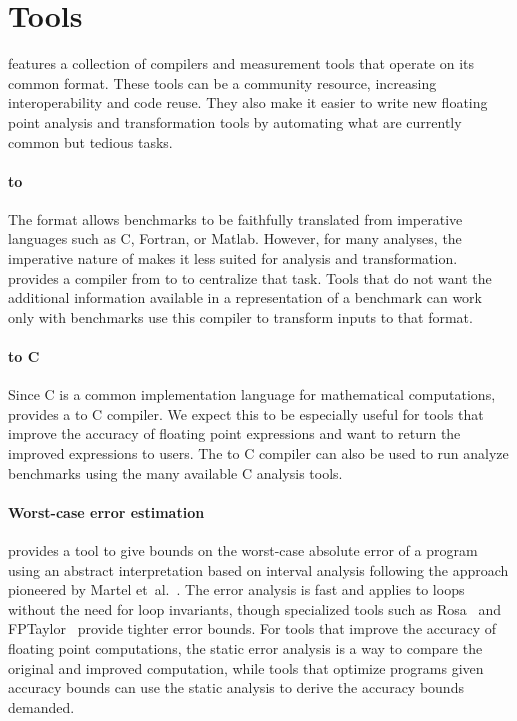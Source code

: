 \documentclass[main.tex]{subfiles}
\begin{document}
\section{Tools}
\label{sec:tools}

\name features
  a collection of compilers and measurement tools
  that operate on its common format.
These tools can be a community resource,
  increasing interoperability and code reuse.
They also make it easier to write
  new floating point analysis and transformation tools
  by automating what are currently
  common but tedious tasks.

\paragraph{\surface to \core}
The \surface format allows \name benchmarks
  to be faithfully translated from imperative languages
  such as C, Fortran, or Matlab.
However, for many analyses,
  the imperative nature of \surface
  makes it less suited for analysis and transformation.
\name provides a compiler from \surface to \core
  to centralize that task.
Tools that do not want the additional information
  available in a \surface representation of a benchmark
  can work only with \core benchmarks
  use this compiler to transform inputs to that format.

\paragraph{\core to C}
Since C is a common implementation language for mathematical computations,
  \name provides a \core to C compiler.
We expect this to be especially useful for tools
  that improve the accuracy of floating point expressions
  and want to return the improved expressions to users.
The \core to C compiler can also be used
  to run analyze \name benchmarks
  using the many available C analysis tools.

\paragraph{Worst-case error estimation}
\name provides a tool to give bounds on
  the worst-case absolute error of a \core program
  using an abstract interpretation based on interval analysis
  following the approach pioneered by Martel et~al.~\cite{martel-ai}.
The error analysis is fast
  and applies to loops without the need for loop invariants,
  though specialized tools such as Rosa~\cite{DarulovaK14}
  and FPTaylor~\cite{fptaylor-fm15}
  provide tighter error bounds.
For tools that improve the accuracy of floating point computations,
  the static error analysis is a way to compare
  the original and improved computation,
  while tools that optimize programs given accuracy bounds
  can use the static analysis to derive the accuracy bounds demanded.
\end{document}
